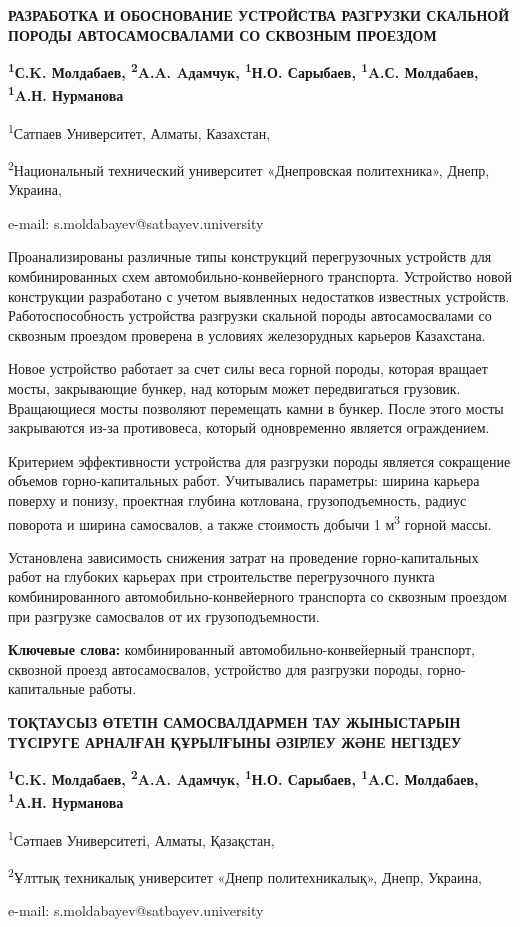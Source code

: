 \begin{center}
{\large\bfseries РАЗРАБОТКА И ОБОСНОВАНИЕ УСТРОЙСТВА РАЗГРУЗКИ СКАЛЬНОЙ ПОРОДЫ
АВТОСАМОСВАЛАМИ СО СКВОЗНЫМ ПРОЕЗДОМ}

{\bfseries \textsuperscript{1}С.K. Молдабаев\envelope,
\textsuperscript{2}A.A. Aдамчук, \textsuperscript{1}Н.О. Сарыбаев,
\textsuperscript{1}A.С. Молдабаев, \textsuperscript{1}A.Н. Нурманова}

\textsuperscript{1}Сатпаев Университет, Алматы, Казахстан,

\textsuperscript{2}Национальный технический университет «Днепровская
политехника», Днепр, Украина,

e-mail: s.moldabayev@satbayev.university
\end{center}

Проанализированы различные типы конструкций перегрузочных устройств для
комбинированных схем автомобильно-конвейерного транспорта. Устройство
новой конструкции разработано с учетом выявленных недостатков известных
устройств. Работоспособность устройства разгрузки скальной породы
автосамосвалами со сквозным проездом проверена в условиях железорудных
карьеров Казахстана.

Новое устройство работает за счет силы веса горной породы, которая
вращает мосты, закрывающие бункер, над которым может передвигаться
грузовик. Вращающиеся мосты позволяют перемещать камни в бункер. После
этого мосты закрываются из-за противовеса, который одновременно является
ограждением.

Критерием эффективности устройства для разгрузки породы является
сокращение объемов горно-капитальных работ. Учитывались параметры:
ширина карьера поверху и понизу, проектная глубина котлована,
грузоподъемность, радиус поворота и ширина самосвалов, а также стоимость
добычи 1 м\textsuperscript{3} горной массы.

Установлена зависимость снижения затрат на проведение горно-капитальных
работ на глубоких карьерах при строительстве перегрузочного пункта
комбинированного автомобильно-конвейерного транспорта со сквозным
проездом при разгрузке самосвалов от их грузоподъемности.

{\bfseries Ключевые слова:} комбинированный автомобильно-конвейерный
транспорт, сквозной проезд автосамосвалов, устройство для разгрузки
породы, горно-капитальные работы\emph{.}

\begin{center}
{\large\bfseries ТОҚТАУСЫЗ ӨТЕТІН САМОСВАЛДАРМЕН ТАУ ЖЫНЫСТАРЫН ТҮСІРУГЕ АРНАЛҒАН
ҚҰРЫЛҒЫНЫ ӘЗІРЛЕУ ЖӘНЕ НЕГІЗДЕУ}

{\bfseries \textsuperscript{1}С.K. Молдабаев\envelope,
\textsuperscript{2}A.A. Aдамчук, \textsuperscript{1}Н.О. Сарыбаев,
\textsuperscript{1}A.С. Молдабаев, \textsuperscript{1}A.Н. Нурманова}

\textsuperscript{1}Сәтпаев Университеті, Алматы, Қазақстан,

\textsuperscript{2}Ұлттық техникалық университет «Днепр политехникалық»,
Днепр, Украина,

e-mail: s.moldabayev@satbayev.university
\end{center}

